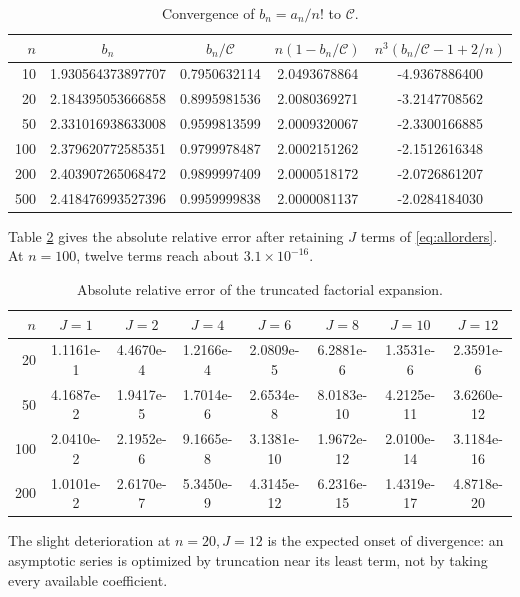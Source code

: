 \documentclass[11pt,a4paper]{article}
\theoremstyle{definition}
\theoremstyle{remark}
\newcommand{\constC}{\mathcal{C}}
\begin{document}
\begin{table}[ht]
\centering
\caption{Convergence of \(b_n=a_n/n!\) to \(\constC\).}
\label{tab:convergence}
\small
\begin{tabular}{rcccc}
\toprule
\(n\)&\(b_n\)&\(b_n/\constC\)&\(n(1-b_n/\constC)\)&\(n^3(b_n/\constC-1+2/n)\)\\
\midrule
10  &1.930564373897707&0.7950632114&2.0493678864&-4.9367886400\\
20  &2.184395053666858&0.8995981536&2.0080369271&-3.2147708562\\
50  &2.331016938633008&0.9599813599&2.0009320067&-2.3300166885\\
100 &2.379620772585351&0.9799978487&2.0002151262&-2.1512616348\\
200 &2.403907265068472&0.9899997409&2.0000518172&-2.0726861207\\
500 &2.418476993527396&0.9959999838&2.0000081137&-2.0284184030\\
\bottomrule
\end{tabular}
\end{table}

Table \ref{tab:errors} gives the absolute relative error after retaining \(J\) terms of \eqref{eq:allorders}.  At \(n=100\), twelve terms reach about \(3.1\times10^{-16}\).

\begin{table}[ht]
\centering
\caption{Absolute relative error of the truncated factorial expansion.}
\label{tab:errors}
\scriptsize
\setlength{\tabcolsep}{4.1pt}
\begin{tabular}{rccccccc}
\toprule
\(n\)&\(J=1\)&\(J=2\)&\(J=4\)&\(J=6\)&\(J=8\)&\(J=10\)&\(J=12\)\\
\midrule
20  &1.1161e-1&4.4670e-4&1.2166e-4&2.0809e-5&6.2881e-6&1.3531e-6&2.3591e-6\\
50  &4.1687e-2&1.9417e-5&1.7014e-6&2.6534e-8&8.0183e-10&4.2125e-11&3.6260e-12\\
100 &2.0410e-2&2.1952e-6&9.1665e-8&3.1381e-10&1.9672e-12&2.0100e-14&3.1184e-16\\
200 &1.0101e-2&2.6170e-7&5.3450e-9&4.3145e-12&6.2316e-15&1.4319e-17&4.8718e-20\\
\bottomrule
\end{tabular}
\end{table}

The slight deterioration at \(n=20,J=12\) is the expected onset of divergence: an asymptotic series is optimized by truncation near its least term, not by taking every available coefficient.
\end{document}
